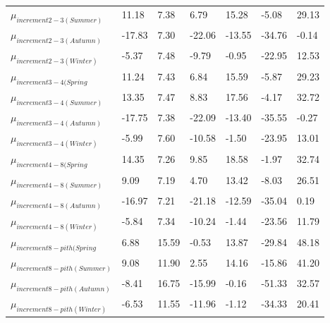 \documentclass{article}\usepackage[]{graphicx}\usepackage[]{color}
\begin{document}
\begin{table}[ht]
\begin{tabular}{|p{}|p{}|p{}|p{}|p{}|p{}|p{}|}
  $\mu_{increment 2-3 (Summer)}$ & 11.18 & 7.38 & 6.79 & 15.28 & -5.08 & 29.13 \\ 
  $\mu_{increment 2-3 (Autumn)}$ & -17.83 & 7.30 & -22.06 & -13.55 & -34.76 & -0.14 \\ 
  $\mu_{increment 2-3 (Winter)}$ & -5.37 & 7.48 & -9.79 & -0.95 & -22.95 & 12.53 \\ 
  $\mu_{increment 3-4 (Spring}$ & 11.24 & 7.43 & 6.84 & 15.59 & -5.87 & 29.23 \\ 
  $\mu_{increment 3-4 (Summer)}$ & 13.35 & 7.47 & 8.83 & 17.56 & -4.17 & 32.72 \\ 
  $\mu_{increment 3-4 (Autumn)}$ & -17.75 & 7.38 & -22.09 & -13.40 & -35.55 & -0.27 \\ 
  $\mu_{increment 3-4 (Winter)}$ & -5.99 & 7.60 & -10.58 & -1.50 & -23.95 & 13.01 \\ 
  $\mu_{increment 4-8 (Spring}$ & 14.35 & 7.26 & 9.85 & 18.58 & -1.97 & 32.74 \\ 
  $\mu_{increment 4-8 (Summer)}$ & 9.09 & 7.19 & 4.70 & 13.42 & -8.03 & 26.51 \\ 
  $\mu_{increment 4-8 (Autumn)}$ & -16.97 & 7.21 & -21.18 & -12.59 & -35.04 & 0.19 \\ 
  $\mu_{increment 4-8 (Winter)}$ & -5.84 & 7.34 & -10.24 & -1.44 & -23.56 & 11.79 \\ 
  $\mu_{increment 8-pith (Spring}$ & 6.88 & 15.59 & -0.53 & 13.87 & -29.84 & 48.18 \\ 
  $\mu_{increment 8-pith (Summer)}$ & 9.08 & 11.90 & 2.55 & 14.16 & -15.86 & 41.20 \\ 
  $\mu_{increment 8-pith (Autumn)}$ & -8.41 & 16.75 & -15.99 & -0.16 & -51.33 & 32.57 \\ 
  $\mu_{increment 8-pith (Winter)}$ & -6.53 & 11.55 & -11.96 & -1.12 & -34.33 & 20.41 \\ 
   \hline
\end{tabular}
\endgroup
\end{table}
\end{document}
